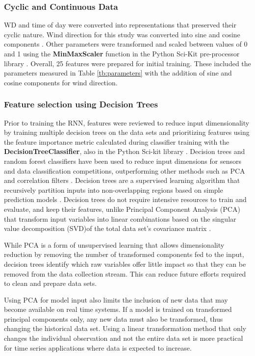 \begin{linenumbers}
\subsubsection{Cyclic and Continuous Data}
WD and time of day were converted into representations that preserved their cyclic nature. Wind direction for this study was converted into sine and cosine components \citep{Arhami2013}. Other parameters were transformed and scaled between values of 0 and 1 \citep{Chatterjee2017} using the \textbf{MinMaxScaler} function in the Python Sci-Kit pre-processor library \citep{scikit2011}. Overall, 25 features were prepared for initial training. These included the parameters measured in Table \ref{tb:parameters} with the addition of sine and cosine components for wind direction. 
 
\subsubsection{Feature selection using Decision Trees}
Prior to training the RNN, features were reviewed to reduce input dimensionality by training multiple decision trees  on the data sets and prioritizing features using the feature importance metric calculated during classifier training with the \textbf{DecisionTreeClassifier}, also in the Python Sci-kit library \citep{scikit2011}. Decision trees and random forest classifiers have been used to reduce input dimensions for sensors \citep{Cho2011} and data classification competitions, outperforming other methods such as PCA and correlation filters \citep{Silipo2014, Al-Alawi2008}. Decision trees are a supervised learning algorithm that recursively partition inputs into non-overlapping regions based on simple prediction models \citep{Singh2013, Loh2011}.  Decision trees do not require intensive resources to train and evaluate, and keep their features, unlike Principal Component Analysis (PCA) that transform input variables into linear combinations based on the singular value decomposition (SVD)of the total data set's covariance matrix \citep{Wang2016}. 

While PCA is a form of unsupervised learning that allows dimensionality reduction by removing the number of transformed components fed to the input, decision trees identify which raw variables offer little impact so that they can be removed from the data collection stream. This can reduce future efforts required to clean and prepare data sets. 

Using PCA for model input also limits the inclusion of new data that may become available on real time systems. If a model is trained on transformed principal components only, any new data must also be transformed, thus changing the historical data set. Using a linear transformation method that only changes the individual observation and not the entire data set is more practical for time series applications where data is expected to increase. 


\end{linenumbers}
